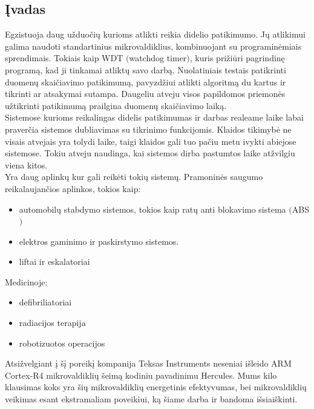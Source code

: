 \documentclass[a4paper, 12pt]{article} %
\begin{document}
\begin{onehalfspacing}

\section*{\k{I}vadas} %


Egzistuoja daug u\v{z}duo\v{c}i\k{u} kurioms atlikti reikia didelio patikimumo. J\k{u} atlikimui galima naudoti standartinius mikrovaldiklius, kombinuojant su programin\.emiais sprendimais. Tokiais kaip WDT $($watchdog timer$)$, kuris pri\v{z}i\=uri pagrindin\k{e} program\k{a}, kad ji tinkamai atlikt\k{u} savo darb\k{a}. Nuolatiniais testais patikrinti duomen\k{u} skai\v{c}iavimo patikimum\k{a}, pavyzd\v{z}iui atlikti algoritm\k{a} du kartus ir tikrinti ar atsakymai sutampa. Daugeliu atveju visos papildomos priemon\.es u\v{z}tikrinti patikimum\k{a} prailgina duomen\k{u} skai\v{c}iavimo laik\k{a}. \\
\indent Sistemose kurioms reikalingas didelis patikimumas ir darbas realeame laike labai praver\v{c}ia sistemos dubliavimas su tikrinimo funkcijomis. Klaidos tikimyb\.e ne visais atvejais yra tolydi laike, taigi klaidos gali tuo pa\v{c}iu metu ivykti abiejose sistemose. Tokiu atveju naudinga, kai sistemos dirba pastumtos laike at\v{z}vilgiu viena kitos. \\
\indent Yra daug aplink\k{u} kur gali reik\.eti toki\k{u} sistem\k{u}. Pramonin\.es saugumo reikalaujan\v{c}ios aplinkos, tokios kaip:
\begin{itemize}
\item automobil\k{u} stabdymo sistemos, tokios kaip rat\k{u} anti blokavimo sistema $($ABS$)$
\item elektros gaminimo ir paskirstymo sistemos.  
\item liftai ir eskalatoriai
\end{itemize}      
Medicinoje:
\begin{itemize}
\item defibriliatoriai
\item radiacijos terapija
\item robotizuotos operacijos
\end{itemize}
\noindent 
\indent Atsi\v{z}velgiant \k{i} \v{s}\k{i} poreik\k{i} kompanija
 Teksas Instruments neseniai i\v{s}leido ARM Cortex-R4 mikrovaldikli\k{u} \v{s}eim\k{a} 
 kodiniu pavadinimu Hercules. Mums kilo klausimas koks yra \v{s}i\k{u}
  mikrovaldikli\k{u} energetinis efektyvumas, bei mikrovaldikli\k{u} veikimas esant ekstramaliam poveikiui, k\k{a} \v{s}iame
   darba ir bandoma i\v{s}siai\v{s}kinti. \\


\end{onehalfspacing}
\end{document}
